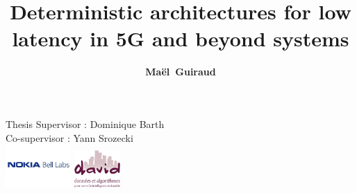 \documentclass[10 pt]{beamer}
\title{ Deterministic architectures for low latency in 5G and beyond systems}
\author{{\bf Maël~Guiraud}}
\institute[Nokia Bell Labs, DAVID-UVSQ] 
{
  Nokia Bell Labs France - DAVID, Universit\'e de Versailles Saint Quentin
   \\
}
\begin{document}
\begin{frame}

  \titlepage
  \centering
  Thesis Supervisor : Dominique Barth\\
   Co-supervisor : Yann Srozecki\\
  \includegraphics [width=25mm]{logon.png} \hspace{1cm} \includegraphics [width=17.5mm]{logod.png} \\
\end{frame}
\end{document}
